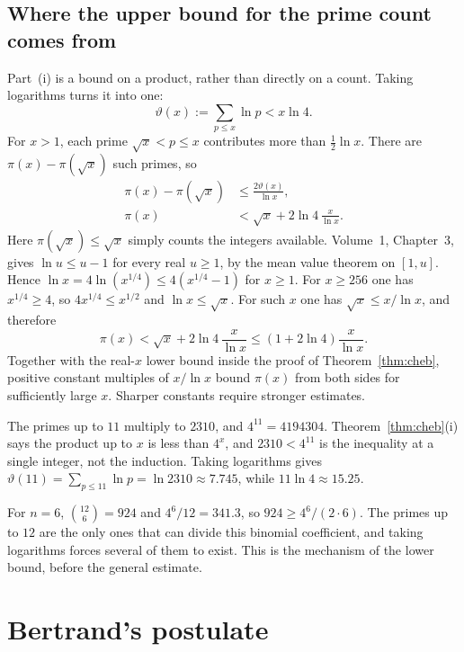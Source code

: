 \subsection*{Where the upper bound for the prime count comes from}
Part~(i) is a bound on a product, rather than directly on a count. Taking logarithms turns it into one:
\[
\vartheta(x):=\sum_{p\le x}\ln p<x\ln4.
\]
For $x>1$, each prime $\sqrt x<p\le x$ contributes more than $\tfrac12\ln x$. There are $\pi(x)-\pi(\sqrt x)$ such primes, so
\[
\begin{aligned}
\pi(x)-\pi(\sqrt x)&\le\frac{2\vartheta(x)}{\ln x},\\
\pi(x)&<\sqrt x+2\ln4\,\frac x{\ln x}.
\end{aligned}
\]
Here $\pi(\sqrt x)\le\sqrt x$ simply counts the integers available. Volume~1, Chapter~3, gives $\ln u\le u-1$ for every real $u\ge1$, by the mean value theorem on $[1,u]$. Hence $\ln x=4\ln(x^{1/4})\le4(x^{1/4}-1)$ for $x\ge1$. For $x\ge256$ one has $x^{1/4}\ge4$, so $4x^{1/4}\le x^{1/2}$ and $\ln x\le\sqrt x$. For such $x$ one has $\sqrt x\le x/\ln x$, and therefore
\[
\pi(x)<\sqrt x+2\ln4\,\frac x{\ln x}\le(1+2\ln4)\frac x{\ln x}.
\]
Together with the real-$x$ lower bound inside the proof of Theorem~\ref{thm:cheb}, positive constant multiples of $x/\ln x$ bound $\pi(x)$ from both sides for sufficiently large $x$. Sharper constants require stronger estimates.

\begin{examplex}
The primes up to $11$ multiply to $2310$, and $4^{11}=4194304$. Theorem~\ref{thm:cheb}(i) says the product up to $x$ is less than $4^x$, and $2310<4^{11}$ is the inequality at a single integer, not the induction. Taking logarithms gives $\vartheta(11)=\sum_{p\le 11}\ln p=\ln 2310\approx 7.745$, while $11\ln 4\approx 15.25$.
\end{examplex}

\begin{examplex}
For $n=6$, $\binom{12}{6}=924$ and $4^6/12=341.3$, so $924\ge 4^6/(2\cdot 6)$. The primes up to $12$ are the only ones that can divide this binomial coefficient, and taking logarithms forces several of them to exist. This is the mechanism of the lower bound, before the general estimate.
\end{examplex}

\section{Bertrand's postulate}

